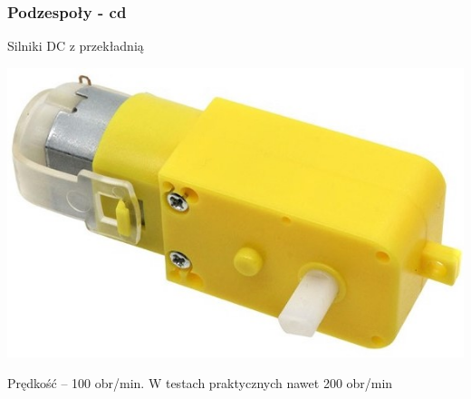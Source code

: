 \begin{frame}
\frametitle{Podzespoły - cd}
\begin{block}{Silniki DC z przekładnią}
	\begin{minipage}{0.39\textwidth}
\begin{center}
\includegraphics[scale=0.22]{silnikDC.jpg}\hspace{12mm}
\end{center}
\end{minipage}
\begin{minipage}{0.59\textwidth}
Prędkość -- 100 obr/min. W testach praktycznych nawet 200 obr/min
\end{minipage}
\end{block}




\end{frame}
